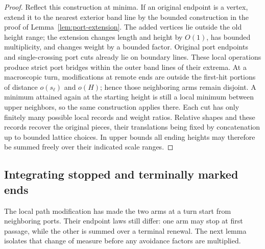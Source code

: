 \begin{proof}
Reflect this construction at minima.  If an original endpoint is a
vertex, extend it to the nearest exterior band line by the bounded
construction in the proof of Lemma~\ref{lem:port-extension}.
The added vertices lie outside the old height range; the extension
changes length and height by \(O(1)\), has bounded multiplicity, and
changes weight by a bounded factor.  Original port endpoints and
single-crossing port cuts already lie on boundary lines.  These local
operations produce strict port bridges within the outer band lines of
their extrema.  At a macroscopic turn, modifications at remote ends
are outside the first-hit portions of distance \(o(s_\ell)\) and
\(o(H)\); hence those neighboring arms remain disjoint.  A minimum
attained again at the starting height is still a local minimum between
upper neighbors, so the same construction applies there.  Each cut
has only finitely many possible local records and weight ratios.
Relative shapes and these records recover the original pieces, their
translations being fixed by concatenation up to bounded lattice
choices.  In upper bounds all ending heights may therefore be summed
freely over their indicated scale ranges.
\end{proof}

\subsection{Integrating stopped and terminally marked ends}
The local path modification has made the two arms at a turn start from
neighboring ports. Their endpoint laws still differ: one arm may stop at
first passage, while the other is summed over a terminal renewal. The next
lemma isolates that change of measure before any avoidance factors are
multiplied.

